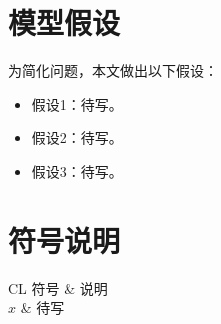 \section{模型假设}
为简化问题，本文做出以下假设：
\begin{itemize}[itemindent=2em]
  \item 假设1：待写。
  \item 假设2：待写。
  \item 假设3：待写。
\end{itemize}

\section{符号说明}
\begin{table}[H]
  \centering
  \begin{tabularx}{\textwidth}{CL}
    \toprule
    符号 & 说明 \\
    \midrule
    $x$ & 待写 \\
    \bottomrule
  \end{tabularx}
  \caption{符号说明}
  \label{tab:符号说明}
\end{table}
